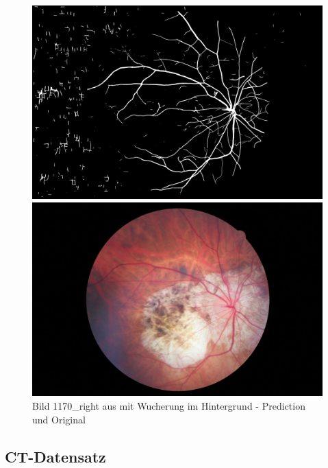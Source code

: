 \begin{figure}[H]
\begin{minipage}{.5\textwidth}
\includegraphics[width=\textwidth]{Pictures/nnUnet/Praxis/Task205-Augen-minimal-13-trainsamples/extra_Bilder/1170_right.png}
\end{minipage}%
\begin{minipage}{.5\textwidth}
\includegraphics[width=\textwidth]{Pictures/nnUnet/Praxis/Task205-Augen-minimal-13-trainsamples/extra_Bilder/1170_right-original.jpeg}
\end{minipage}
\caption{Bild 1170\_right aus \cite{retina2dExtra} mit Wucherung im Hintergrund - Prediction und Original}
\label{pic:retinaExtraB}
\end{figure}




\subsection{CT-Datensatz}

